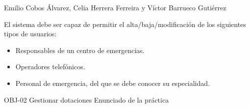 {Emilio Cobos Álvarez, Celia Herrera Ferreira y Víctor Barrueco Gutiérrez}
{El sistema debe ser capaz de permitir el alta/baja/modificación de los siguientes tipos de usuarios: \par
\begin{itemize}
\item Responsables de un centro de emergencias.
\item Operadores telefónicos.
\item Personal de emergencia, del que se debe conocer su especialidad.
\end{itemize}
}
{OBJ-02 Gestionar dotaciones}
{Enunciado de la práctica}

